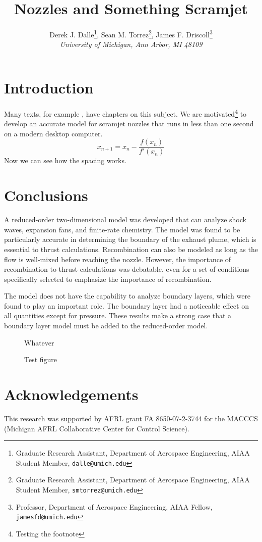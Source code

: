 \documentclass[conference]{../aiaa-pretty}
\author[Dalle, Torrez, and Driscoll]{ %
Derek J. Dalle\thanks{Graduate Research Assistant, Department of Aerospace Engineering, AIAA Student Member, \texttt{dalle@umich.edu}},
Sean M. Torrez\thanks{Graduate Research Assistant, Department of Aerospace Engineering, AIAA Student Member, \texttt{smtorrez@umich.edu}},
James F. Driscoll\thanks{Professor, Department of Aerospace Engineering, AIAA Fellow, \texttt{jamesfd@umich.edu}}\\
\textit{\small{University of Michigan, Ann Arbor, MI 48109}}}
\title{Nozzles and Something Scramjet}
\begin{document}
\maketitle 

\section{Introduction}
Many texts, for example \cite{chapra:2002:numerics}, have chapters on this subject.  We are motivated\footnote{Testing the footnote} to develop an accurate model for scramjet nozzles that runs in less than one second on a modern desktop computer.
\begin{equation}
x_{n+1} = x_n - \frac{f(x_n)}{f'(x_n)}
\end{equation}
Now we can see how the spacing works.

\section{Conclusions}                            \label{sec:conclusion}
A reduced-order two-dimensional model was developed that can analyze shock waves, expansion fans, and finite-rate chemistry.  The model was found to be particularly accurate in determining the boundary of the exhaust plume, which is essential to thrust calculations.  Recombination can also be modeled as long as the flow is well-mixed before reaching the nozzle.  However, the importance of recombination to thrust calculations was debatable, even for a set of conditions specifically selected to emphasize the importance of recombination.

The model does not have the capability to analyze boundary layers, which were found to play an important role.  The boundary layer had a noticeable effect on all quantities except for pressure.  These results make a strong case that a boundary layer model must be added to the reduced-order model.

\begin{figure}[!h]
 \begin{center}
  Whatever
 \end{center}
 \caption{Test figure}
\end{figure}

\section*{Acknowledgements}
This research was supported by AFRL grant FA 8650-07-2-3744  for the MACCCS (Michigan AFRL Collaborative Center for Control Science).



\end{document}
